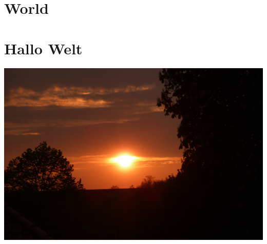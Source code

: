 \documentclass[12pt,ngerman]{leaflet}
\begin{document}
\blindtext[4]

\section{World}

\blindtext

\section{Hallo Welt}

\blindtext

\includegraphics[width=\textwidth]{Bilder/Sonnenaufgang}
\end{document}
